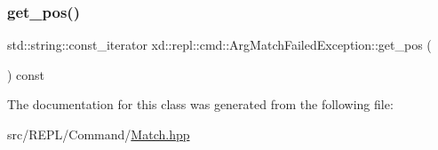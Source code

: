 \subsubsection{\texorpdfstring{get\+\_\+pos()}{get\_pos()}}
{\footnotesize\ttfamily std\+::string\+::const\+\_\+iterator xd\+::repl\+::cmd\+::\+Arg\+Match\+Failed\+Exception\+::get\+\_\+pos (\begin{DoxyParamCaption}{ }\end{DoxyParamCaption}) const\hspace{0.3cm}{\ttfamily [inline]}}



The documentation for this class was generated from the following file\+:\begin{DoxyCompactItemize}
\item 
src/\+R\+E\+P\+L/\+Command/\mbox{\hyperlink{_command_2_match_8hpp}{Match.\+hpp}}\end{DoxyCompactItemize}
